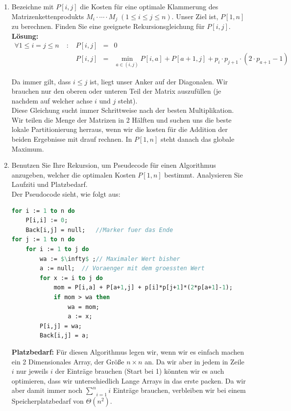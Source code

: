 \documentclass[11pt,a4paper,ngerman]{article}
\begin{document}
\begin{enumerate}[\bfseries (a)]


\item Bezeichne mit $P[i,j]$ die Kosten für eine optimale Klammerung des Matrizenkettenprodukts $M_i \cdot \cdots \cdot M_j \; ( 1 \leq i \leq j \leq n)$. Unser Ziel ist, $P[1,n]$ zu berechnen. Finden Sie eine geeignete Rekursionsgleichung für $P[i,j]$.\\

\textbf{Lösung:}
$$
\begin{array}{lcrcl}
\forall 1 \leq i = j \leq n &\; : \;& P[i,j] &=& 0\\
&& P[i,j] &=& \underset{a \in (i,j)}{\min} P[i,a] + P[a+1,j] + p_i \cdot p_{j+1} \cdot (2 \cdot p_{a+1} - 1)
\end{array}
$$

Da immer gilt, dass $i \leq j$ ist, liegt unser Anker auf der Diagonalen. Wir brauchen nur den oberen oder unteren Teil der Matrix auszufüllen (je nachdem auf welcher achse $i$ und $j$ steht).\\

Diese Gleichung sucht immer Schrittweise nach der besten Multiplikation. Wir teilen die Menge der Matrizen in 2 Hälften und suchen uns die beste lokale Partitionierung herraus, wenn wir die kosten für die Addition der beiden Ergebnisse mit drauf rechnen. In $P[1,n]$ steht danach das globale Maximum.

\item Benutzen Sie Ihre Rekursion, um Pseudecode für einen Algorithmus anzugeben, welcher die optimalen Kosten $P[1,n]$ bestimmt. Analysieren Sie Laufziti und Platzbedarf.\\

Der Pseudocode sieht, wie folgt aus:

\begin{lstlisting}[language=Pascal, numbers=right]
for i := 1 to n do
	P[i,i] := 0;
	Back[i,j] = null;	//Marker fuer das Ende
for j := 1 to n do
	for i := 1 to j do
		wa := $\infty$ ;// Maximaler Wert bisher
		a := null;	// Voraenger mit dem groessten Wert
		for x := i to j do
			mom = P[i,a] + P[a+1,j] + p[i]*p[j+1]*(2*p[a+1]-1);
			if mom > wa then
				wa = mom;
				a := x;
		P[i,j] = wa;
		Back[i,j] = a;
\end{lstlisting}

\textbf{Platzbedarf:} Für diesen Algorithmus legen wir, wenn wir es einfach machen ein 2 Dimensionales Array, der Größe $n \times n$ an. Da wir aber in jedem in Zeile $i$ nur jeweils $i$ der Einträge brauchen (Start bei 1) könnten wir es auch optimieren, dass wir unterschiedlich Lange Arrays in das erste packen. Da wir aber damit immer noch $\underset{i=1}{\overset{n}{\sum}} i$ Einträge brauchen, verbleiben wir bei einem Speicherplatzbedarf von $\Theta (n^2)$.\\


\end{enumerate}
\end{document}
